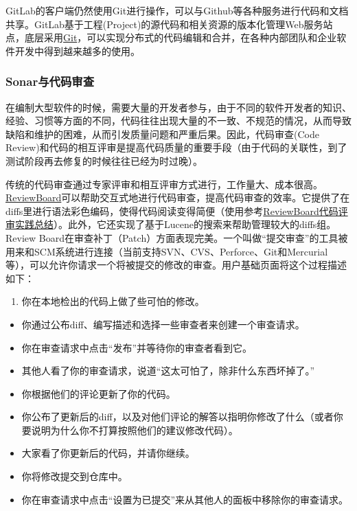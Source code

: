\documentclass[letterpaper,10pt,english]{sphinxmanual}
\begin{document}
GitLab的客户端仍然使用Git进行操作，可以与Github等各种服务进行代码和文档共享。GitLab基于工程(Project)的源代码和相关资源的版本化管理Web服务站点，底层采用\href{https://git-scm.com/}{Git}，可以实现分布式的代码编辑和合并，在各种内部团队和企业软件开发中得到越来越多的使用。


\subsubsection{Sonar与代码审查}
\label{gispark_paas:Sonar_u4e0e_u4ee3_u7801_u5ba1_u67e5}
在编制大型软件的时候，需要大量的开发者参与，由于不同的软件开发者的知识、经验、习惯等方面的不同，代码往往出现大量的不一致、不规范的情况，从而导致缺陷和维护的困难，从而引发质量问题和严重后果。因此，代码审查(Code
Review)和代码的相互评审是提高代码质量的重要手段（由于代码的关联性，到了测试阶段再去修复的时候往往已经为时过晚）。

传统的代码审查通过专家评审和相互评审方式进行，工作量大、成本很高。\href{https://www.reviewboard.org/}{ReviewBoard}可以帮助交互式地进行代码审查，提高代码审查的效率。它提供了在diffs里进行语法彩色编码，使得代码阅读变得简便（使用参考\href{http://my.oschina.net/u/2306127/blog/541250}{ReviewBoard代码评审实践总结}）。此外，它还实现了基于Lucene的搜索来帮助管理较大的diffs组。Review
Board在审查补丁（Patch）方面表现完美。一个叫做“提交审查”的工具被用来和SCM系统进行连接（当前支持SVN、CVS、Perforce、Git和Mercurial等），可以允许你请求一个将被提交的修改的审查。用户基础页面将这个过程描述如下：
\begin{enumerate}
\item {} 
你在本地检出的代码上做了些可怕的修改。

\end{enumerate}
\begin{itemize}
\item {} 
你通过公布diff、编写描述和选择一些审查者来创建一个审查请求。

\item {} 
你在审查请求中点击“发布”并等待你的审查者看到它。

\item {} 
其他人看了你的审查请求，说道“这太可怕了，除非什么东西坏掉了。”

\item {} 
你根据他们的评论更新了你的代码。

\item {} 
你公布了更新后的diff，以及对他们评论的解答以指明你修改了什么（或者你要说明为什么你不打算按照他们的建议修改代码）。

\item {} 
大家看了你更新后的代码，并请你继续。

\item {} 
你将修改提交到仓库中。

\item {} 
你在审查请求中点击“设置为已提交”来从其他人的面板中移除你的审查请求。

\end{itemize}
\end{document}
